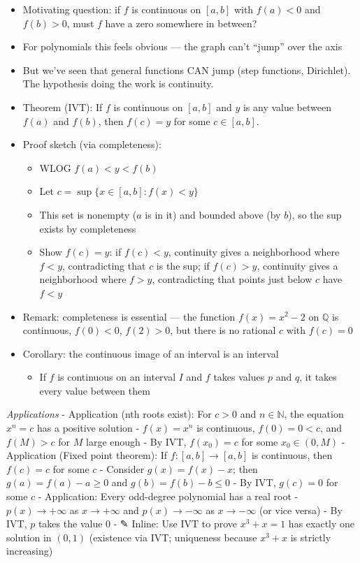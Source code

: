 \documentclass[
  10pt,
  letterpaper,
]{scrbook}
\providecommand{\tightlist}{%
  \setlength{\itemsep}{0pt}\setlength{\parskip}{0pt}}
\newcommand{\NN}{\mathbb{N}}
\newcommand{\QQ}{\mathbb{Q}}
\begin{document}
\begin{itemize}
\tightlist
\item
  Motivating question: if \(f\) is continuous on \([a,b]\) with
  \(f(a) < 0\) and \(f(b) > 0\), must \(f\) have a zero somewhere in
  between?
\item
  For polynomials this feels obvious --- the graph can't ``jump'' over
  the axis
\item
  But we've seen that general functions CAN jump (step functions,
  Dirichlet). The hypothesis doing the work is continuity.
\item
  Theorem (IVT): If \(f\) is continuous on \([a,b]\) and \(y\) is any
  value between \(f(a)\) and \(f(b)\), then \(f(c) = y\) for some
  \(c \in [a,b]\).
\item
  Proof sketch (via completeness):

  \begin{itemize}
  \tightlist
  \item
    WLOG \(f(a) < y < f(b)\)
  \item
    Let \(c = \sup\{x \in [a,b] : f(x) < y\}\)
  \item
    This set is nonempty (\(a\) is in it) and bounded above (by \(b\)),
    so the sup exists by completeness
  \item
    Show \(f(c) = y\): if \(f(c) < y\), continuity gives a neighborhood
    where \(f < y\), contradicting that \(c\) is the sup; if
    \(f(c) > y\), continuity gives a neighborhood where \(f > y\),
    contradicting that points just below \(c\) have \(f < y\)
  \end{itemize}
\item
  Remark: completeness is essential --- the function \(f(x) = x^2 - 2\)
  on \(\QQ\) is continuous, \(f(0) < 0\), \(f(2) > 0\), but there is no
  rational \(c\) with \(f(c) = 0\)
\item
  Corollary: the continuous image of an interval is an interval

  \begin{itemize}
  \tightlist
  \item
    If \(f\) is continuous on an interval \(I\) and \(f\) takes values
    \(p\) and \(q\), it takes every value between them
  \end{itemize}
\end{itemize}

\emph{Applications} - Application (nth roots exist): For \(c > 0\) and
\(n \in \NN\), the equation \(x^n = c\) has a positive solution -
\(f(x) = x^n\) is continuous, \(f(0) = 0 < c\), and \(f(M) > c\) for
\(M\) large enough - By IVT, \(f(x_0) = c\) for some \(x_0 \in (0, M)\)
- Application (Fixed point theorem): If \(f: [a,b] \to [a,b]\) is
continuous, then \(f(c) = c\) for some \(c\) - Consider
\(g(x) = f(x) - x\); then \(g(a) = f(a) - a \geq 0\) and
\(g(b) = f(b) - b \leq 0\) - By IVT, \(g(c) = 0\) for some \(c\) -
Application: Every odd-degree polynomial has a real root -
\(p(x) \to +\infty\) as \(x \to +\infty\) and \(p(x) \to -\infty\) as
\(x \to -\infty\) (or vice versa) - By IVT, \(p\) takes the value \(0\)
- ✎ Inline: Use IVT to prove \(x^3 + x = 1\) has exactly one solution in
\((0, 1)\) (existence via IVT; uniqueness because \(x^3 + x\) is
strictly increasing)
\end{document}
